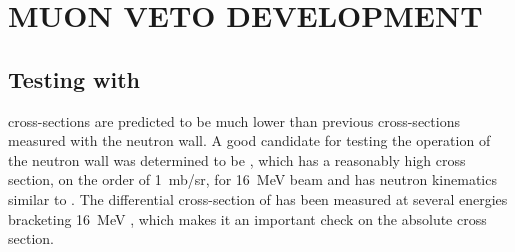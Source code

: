 %
%
%
%
%
%
%
%

%
%

\chapter{MUON VETO DEVELOPMENT}
\label{chap:muVeto}

\section{Testing with \MgReaction}

\reaction cross-sections are predicted to be much lower than previous cross-sections measured with the neutron wall.  A good candidate for testing the operation of the neutron wall was determined to be \MgReaction, which has a reasonably high cross section, on the order of 1~mb/sr, for 16~MeV  beam and has neutron kinematics similar to \reaction.  The differential cross-section of \MgReaction has been measured at several energies bracketing 16~MeV \citep{Bohne_Mg, MgCrossSection1}, which makes it an important check on the \reaction absolute cross section.  

